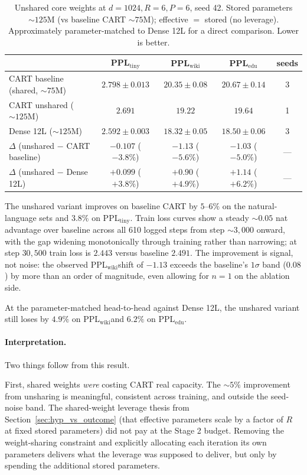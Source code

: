 \documentclass{article}
\newcommand{\cart}{\textsc{CART}}
\newcommand{\pplwiki}{PPL$_\text{wiki}$}
\newcommand{\ppltiny}{PPL$_\text{tiny}$}
\newcommand{\ppledu}{PPL$_\text{edu}$}
\begin{document}
\begin{table}[htbp]
\centering
\caption{Unshared core weights at $d{=}1024, R{=}6, P{=}6$, seed 42. Stored parameters $\sim 125$M (vs baseline \cart{} $\sim 75$M); effective $=$ stored (no leverage). Approximately parameter-matched to Dense 12L for a direct comparison. Lower is better.}
\label{tab:abl_unshared}
\footnotesize
\begin{tabular}{lcccc}
\toprule
 & \ppltiny & \pplwiki & \ppledu & seeds \\
\midrule
\cart{} baseline (shared, $\sim 75$M)        & $2.798 \pm 0.013$ & $20.35 \pm 0.08$ & $20.67 \pm 0.14$ & 3 \\
\cart{} unshared ($\sim 125$M)               & $2.691$           & $19.22$          & $19.64$          & 1 \\
Dense 12L ($\sim 125$M)                      & $2.592 \pm 0.003$ & $18.32 \pm 0.05$ & $18.50 \pm 0.06$ & 3 \\
\midrule
$\Delta$ (unshared $-$ \cart{} baseline)               & $-0.107$ ($-3.8\%$) & $-1.13$ ($-5.6\%$) & $-1.03$ ($-5.0\%$) & --- \\
$\Delta$ (unshared $-$ Dense 12L)                      & $+0.099$ ($+3.8\%$) & $+0.90$ ($+4.9\%$) & $+1.14$ ($+6.2\%$) & --- \\
\bottomrule
\end{tabular}
\end{table}

The unshared variant improves on baseline \cart{} by $5$--$6\%$ on the natural-language sets and $3.8\%$ on \ppltiny. Train loss curves show a steady $\sim 0.05$ nat advantage over baseline across all 610 logged steps from step $\sim 3{,}000$ onward, with the gap widening monotonically through training rather than narrowing; at step $30{,}500$ train loss is $2.443$ versus baseline $2.491$. The improvement is signal, not noise: the observed \pplwiki shift of $-1.13$ exceeds the baseline's $1\sigma$ band ($0.08$) by more than an order of magnitude, even allowing for $n{=}1$ on the ablation side.

At the parameter-matched head-to-head against Dense 12L, the unshared variant still loses by $4.9\%$ on \pplwiki and $6.2\%$ on \ppledu.

\paragraph{Interpretation.}
Two things follow from this result.

First, shared weights \emph{were} costing \cart{} real capacity. The $\sim 5\%$ improvement from unsharing is meaningful, consistent across training, and outside the seed-noise band. The shared-weight leverage thesis from Section~\ref{sec:hyp_vs_outcome} (that effective parameters scale by a factor of $R$ at fixed stored parameters) did not pay at the Stage 2 budget. Removing the weight-sharing constraint and explicitly allocating each iteration its own parameters delivers what the leverage was supposed to deliver, but only by spending the additional stored parameters.
\end{document}
